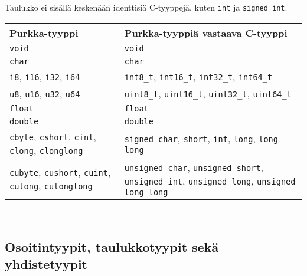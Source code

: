 Taulukko ei sisällä keskenään identtisiä C-tyyppejä, kuten \texttt{int} ja
\texttt{signed int}. \\[0.3cm]
\begin{tabular}{@{}p{5.8cm}p{8.7cm}@{}} \toprule
    Purkka-tyyppi & Purkka-tyyppiä vastaava C-tyyppi \\ \midrule
    \texttt{void} & \texttt{void} \\
    \texttt{char} & \texttt{char} \\
    \texttt{i8}, \texttt{i16}, \texttt{i32}, \texttt{i64} &
    \texttt{int8\_t}, \texttt{int16\_t}, \texttt{int32\_t}, \texttt{int64\_t} \\
    \texttt{u8}, \texttt{u16}, \texttt{u32}, \texttt{u64} &
    \texttt{uint8\_t}, \texttt{uint16\_t}, \texttt{uint32\_t}, \texttt{uint64\_t} \\
    \texttt{float} & \texttt{float} \\
    \texttt{double} & \texttt{double} \\
    [0.3cm]

    \texttt{cbyte}, \texttt{cshort}, \texttt{cint}, \texttt{clong}, \texttt{clonglong}
    & \texttt{signed char}, \texttt{short}, \texttt{int}, \texttt{long}, \texttt{long long} \\
    \noalign{\vspace{0.3cm}}

    \texttt{cubyte}, \texttt{cushort}, \texttt{cuint}, \texttt{culong}, \texttt{culonglong}
    & \texttt{unsigned char}, \texttt{unsigned short}, \texttt{unsigned int},
      \texttt{unsigned long}, \texttt{unsigned long long} \\
    \bottomrule
\end{tabular} \\

\subsection{Osoitintyypit, taulukkotyypit sekä yhdistetyypit}

